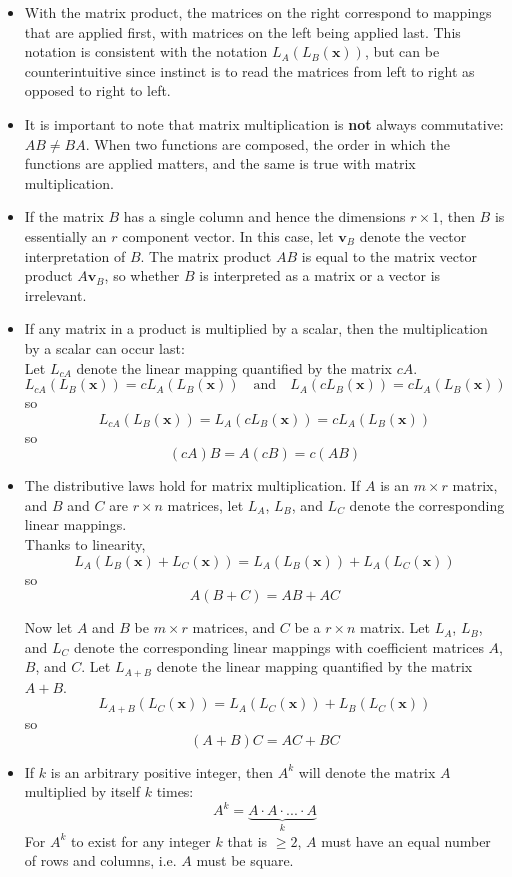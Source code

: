 \documentclass{article}
\begin{document}
\begin{itemize}
\item With the matrix product, the matrices on the right correspond to mappings that are applied first, with matrices on the left being applied last. This notation is consistent with the notation \(L_A(L_B(\mathbf{x}))\), but can be counterintuitive since instinct is to read the matrices from left to right as opposed to right to left. 
\item It is important to note that matrix multiplication is {\bf not} always commutative: \(AB \neq BA\). When two functions are composed, the order in which the functions are applied matters, and the same is true with matrix multiplication.
\item If the matrix \(B\) has a single column and hence the dimensions \(r \times 1\), then \(B\) is essentially an \(r\) component vector. In this case, let \(\mathbf{v}_B\) denote the vector interpretation of \(B\). The matrix product \(AB\) is equal to the matrix vector product \(A\mathbf{v}_B\), so whether \(B\) is interpreted as a matrix or a vector is irrelevant. 
\item 
If any matrix in a product is multiplied by a scalar, then the multiplication by a scalar can occur last: \\
Let \(L_{cA}\) denote the linear mapping quantified by the matrix \(cA\).
\[L_{cA}(L_B(\mathbf{x})) = c L_A(L_B(\mathbf{x})) \quad\text{and}\quad L_A(c L_B(\mathbf{x})) = c L_A(L_B(\mathbf{x}))\]
so
\[L_{cA}(L_B(\mathbf{x})) = L_A(c L_B(\mathbf{x})) = c L_A(L_B(\mathbf{x}))\]
so
\[(cA)B = A(cB) = c(AB)\]
\item
The distributive laws hold for matrix multiplication. If \(A\) is an \(m \times r\) matrix, and \(B\) and \(C\) are \(r \times n\) matrices, let \(L_A\), \(L_B\), and \(L_C\) denote the corresponding linear mappings. \\
Thanks to linearity,
\[L_A(L_B(\mathbf{x}) + L_C(\mathbf{x})) = L_A(L_B(\mathbf{x})) + L_A(L_C(\mathbf{x}))\]
so
\[A(B + C) = AB + AC\]

Now let \(A\) and \(B\) be \(m \times r\) matrices, and \(C\) be a \(r \times n\) matrix. Let \(L_A\), \(L_B\), and \(L_C\) denote the corresponding linear mappings with coefficient matrices \(A\), \(B\), and \(C\). Let \(L_{A+B}\) denote the linear mapping quantified by the matrix \(A + B\).
\[L_{A+B}(L_C(\mathbf{x})) = L_A(L_C(\mathbf{x})) + L_B(L_C(\mathbf{x}))\]
so
\[(A + B)C = AC + BC\]

\item
If \(k\) is an arbitrary positive integer, then \(A^k\) will denote the matrix \(A\) multiplied by itself \(k\) times:
\[A^k = \underbrace{A \cdot A \cdot ... \cdot A}_k\]
For \(A^k\) to exist for any integer \(k\) that is \(\geq 2\), \(A\) must have an equal number of rows and columns, i.e. \(A\) must be square. 
\end{itemize}
\end{document}
